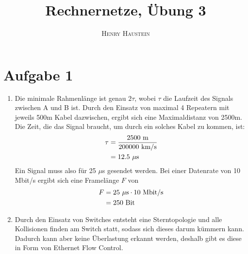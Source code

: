 \documentclass{article}
\title{\textbf{Rechnernetze, Übung 3}}
\author{\textsc{Henry Haustein}}
\date{}
\begin{document}
	\maketitle
	
	\section*{Aufgabe 1}
	\begin{enumerate}[label=(\alph*)]
		\item Die minimale Rahmenlänge ist genau $2\tau$, wobei $\tau$ die Laufzeit des Signals zwischen A und B ist. Durch den Einsatz von maximal 4 Repeatern mit jeweils 500m Kabel dazwischen, ergibt sich eine Maximaldistanz von 2500m. Die Zeit, die das Signal braucht, um durch ein solches Kabel zu kommen, ist:
		\begin{align}
			\tau &= \frac{2500\text{ m}}{200000\text{ km/s}} \notag \\
			&= 12.5 \text{ $\mu$s} \notag
		\end{align}
		Ein Signal muss also für 25 $\mu$s gesendet werden. Bei einer Datenrate von 10 Mbit/s ergibt sich eine Framelänge $F$ von
		\begin{align}
			F &= 25\text{ $\mu$s} \cdot 10 \text{ Mbit/s} \notag \\
			&= 250\text{ Bit} \notag
		\end{align}
		\item Durch den Einsatz von Switches entsteht eine Sterntopologie und alle Kollisionen finden am Switch statt, sodass sich dieses darum kümmern kann. Dadurch kann aber keine Überlastung erkannt werden, deshalb gibt es diese in Form von Ethernet Flow Control.
	\end{enumerate}
\end{document}
